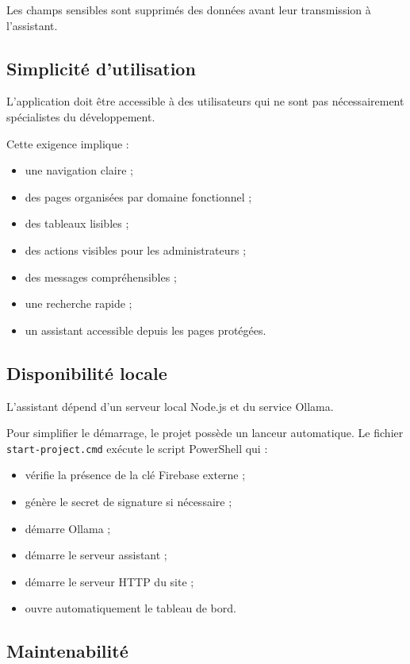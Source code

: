 \documentclass{rapportENSIAS}
\begin{document}
Les champs sensibles sont supprimés des données avant leur transmission à l’assistant.

\subsection{Simplicité d’utilisation}

L’application doit être accessible à des utilisateurs qui ne sont pas nécessairement spécialistes du développement.

Cette exigence implique :

\begin{itemize}
\item une navigation claire ;
\item des pages organisées par domaine fonctionnel ;
\item des tableaux lisibles ;
\item des actions visibles pour les administrateurs ;
\item des messages compréhensibles ;
\item une recherche rapide ;
\item un assistant accessible depuis les pages protégées.
\end{itemize}

\subsection{Disponibilité locale}

L’assistant dépend d’un serveur local Node.js et du service Ollama.

Pour simplifier le démarrage, le projet possède un lanceur automatique. Le fichier \texttt{start-project.cmd} exécute le script PowerShell qui :

\begin{itemize}
\item vérifie la présence de la clé Firebase externe ;
\item génère le secret de signature si nécessaire ;
\item démarre Ollama ;
\item démarre le serveur assistant ;
\item démarre le serveur HTTP du site ;
\item ouvre automatiquement le tableau de bord.
\end{itemize}

\subsection{Maintenabilité}
\end{document}
